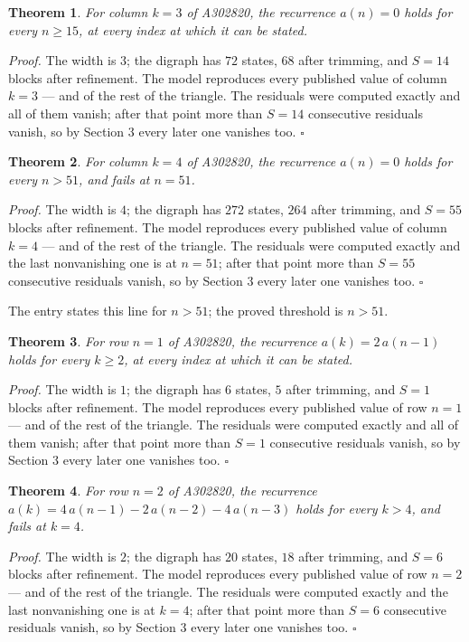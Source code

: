 \documentclass[11pt]{article}
\newtheorem{theorem}{Theorem}
\theoremstyle{definition}
\begin{document}
\begin{theorem} For column $k = 3$ of A302820, the recurrence $a(n) = 0$ holds for every $n \ge 15$, at every index at which it can be stated.\end{theorem}

{\itshape Proof.} The width is $3$; the digraph has $72$ states, $68$ after trimming, and $S = 14$ blocks after refinement. The model reproduces every published value of column $k = 3$ --- and of the rest of the triangle. The residuals were computed exactly and all of them vanish; after that point more than $S = 14$ consecutive residuals vanish, so by Section 3 every later one vanishes too. $\square$

\begin{theorem} For column $k = 4$ of A302820, the recurrence $a(n) = 0$ holds for every $n > 51$, and fails at $n = 51$.\end{theorem}

{\itshape Proof.} The width is $4$; the digraph has $272$ states, $264$ after trimming, and $S = 55$ blocks after refinement. The model reproduces every published value of column $k = 4$ --- and of the rest of the triangle. The residuals were computed exactly and the last nonvanishing one is at $n = 51$; after that point more than $S = 55$ consecutive residuals vanish, so by Section 3 every later one vanishes too. $\square$

The entry states this line for $n > 51$; the proved threshold is $n > 51$.

\begin{theorem} For row $n = 1$ of A302820, the recurrence $a(k) = 2\,a(n-1)$ holds for every $k \ge 2$, at every index at which it can be stated.\end{theorem}

{\itshape Proof.} The width is $1$; the digraph has $6$ states, $5$ after trimming, and $S = 1$ blocks after refinement. The model reproduces every published value of row $n = 1$ --- and of the rest of the triangle. The residuals were computed exactly and all of them vanish; after that point more than $S = 1$ consecutive residuals vanish, so by Section 3 every later one vanishes too. $\square$

\begin{theorem} For row $n = 2$ of A302820, the recurrence $a(k) = 4\,a(n-1) - 2\,a(n-2) - 4\,a(n-3)$ holds for every $k > 4$, and fails at $k = 4$.\end{theorem}

{\itshape Proof.} The width is $2$; the digraph has $20$ states, $18$ after trimming, and $S = 6$ blocks after refinement. The model reproduces every published value of row $n = 2$ --- and of the rest of the triangle. The residuals were computed exactly and the last nonvanishing one is at $k = 4$; after that point more than $S = 6$ consecutive residuals vanish, so by Section 3 every later one vanishes too. $\square$
\end{document}
